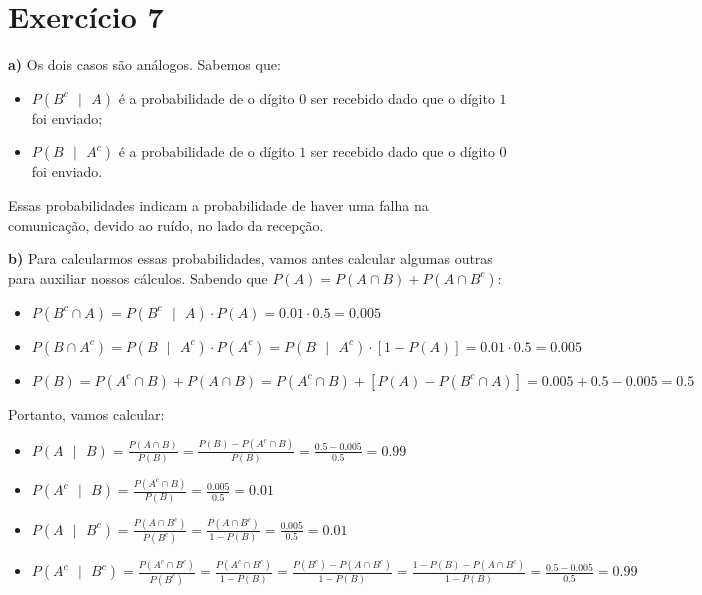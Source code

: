 \documentclass[12pt,letterpaper]{article}
\begin{document}
	\section*{Exercício 7}
	
	\textbf{a)} Os dois casos são análogos. Sabemos que:
	
	\begin{itemize}
		\item $P(B^c\text{ }|\text{ }A)$ é a probabilidade de o dígito $0$ ser recebido dado que o dígito $1$ foi enviado;
		\item $P(B\text{ }|\text{ }A^c)$ é a probabilidade de o dígito $1$ ser recebido dado que o dígito $0$ foi enviado.
	\end{itemize}
	
	Essas probabilidades indicam a probabilidade de haver uma falha na comunicação, devido ao ruído, no lado da recepção.
	
	\textbf{b)} Para calcularmos essas probabilidades, vamos antes calcular algumas outras para auxiliar nossos cálculos. Sabendo que $P(A) = P(A \cap B) + P(A \cap B^c)$:
	
	\begin{itemize}
		\item $P(B^c \cap A) = P(B^c\text{ }|\text{ }A) \cdot P(A) = 0.01 \cdot 0.5 = 0.005$
		\item $P(B \cap A^c) = P(B\text{ }|\text{ }A^c) \cdot P(A^c) = P(B\text{ }|\text{ }A^c) \cdot [1-P(A)] = 0.01 \cdot 0.5 = 0.005$
		\item $P(B) = P(A^c \cap B) + P(A \cap B) = P(A^c \cap B) + [P(A) - P(B^c \cap A)] = 0.005 + 0.5 - 0.005 = 0.5$
	\end{itemize}
	
	Portanto, vamos calcular:
	
	\begin{itemize}
		\item $P(A\text{ }|\text{ }B) = \frac{P(A \cap B)}{P(B)} = \frac{P(B) - P(A^c \cap B)}{P(B)} = \frac{0.5 -0.005}{0.5} = 0.99$
		\item $P(A^c\text{ }|\text{ }B) = \frac{P(A^c \cap B)}{P(B)} = \frac{0.005}{0.5} = 0.01$
		\item $P(A\text{ }|\text{ }B^c) = \frac{P(A \cap B^c)}{P(B^c)} = \frac{P(A \cap B^c)}{1 - P(B)} = \frac{0.005}{0.5} = 0.01$
		\item $P(A^c\text{ }|\text{ }B^c) = \frac{P(A^c \cap B^c)}{P(B^c)} = \frac{P(A^c \cap B^c)}{1 - P(B)} = \frac{P(B^c) - P(A \cap B^c)}{1 - P(B)} = \frac{1 - P(B) - P(A \cap B^c)}{1 - P(B)} = \frac{0.5 - 0.005}{0.5} = 0.99$
	\end{itemize}
	
\end{document}
